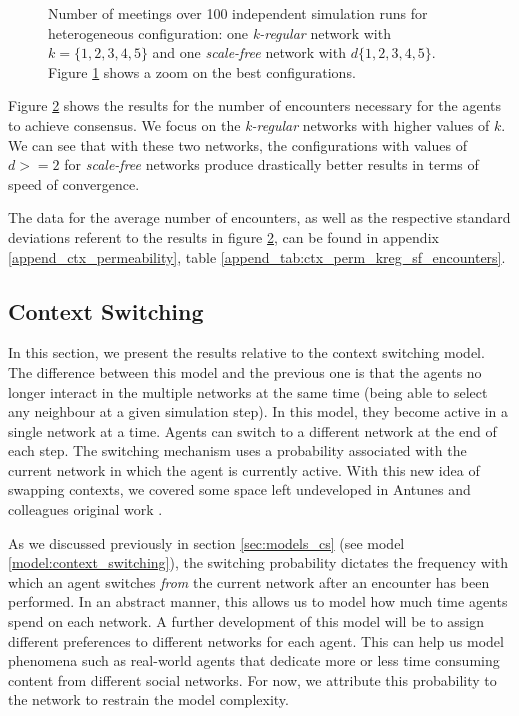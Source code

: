 \documentclass[preprint,number]{elsarticle}
\begin{document}
\begin{figure}[H]
\begin{subfigure}{.49\linewidth}
		\caption{}
		\label{fig:ctx_perm_sfkreg_1020304050best}
	\end{subfigure}
	\begin{minipage}{0.9\linewidth}
		\vspace{0.2cm}
		\caption{Number of meetings over 100 independent simulation runs for heterogeneous configuration: one \textit{k-regular} network with  $k=\{1,2,3,4,5\}$ and one \textit{scale-free} network with $d\{1,2,3,4,5\}$. Figure \ref{fig:ctx_perm_sfkreg_1020304050best} shows a zoom on the best configurations.}
		\label{fig:ctx_perm_sfkreg}
	\end{minipage}
\end{figure}

Figure \ref{fig:ctx_perm_sfkreg} shows the results for the number of encounters necessary for the agents to achieve consensus. We focus on the \textit{k-regular} networks with higher values of $k$. We can see that with these two networks, the configurations with values of $d>=2$ for \textit{scale-free} networks produce drastically better results in terms of speed of convergence.

The data for the average number of encounters, as well as the respective standard deviations referent to the results in figure \ref{fig:ctx_perm_sfkreg}, can be found in appendix \ref{append_ctx_permeability}, table \ref{append_tab:ctx_perm_kreg_sf_encounters}.



\subsection{Context Switching}
\noindent In this section, we present the results relative to the context switching model. The difference between this model and the previous one is that the agents no longer interact in the multiple networks at the same time (being able to select any neighbour at a given simulation step). In this model, they become active in a single network at a time. Agents can switch to a different network at the end of each step. The switching mechanism uses a probability associated with the current network in which the agent is currently active. With this new idea of swapping contexts, we covered some space left undeveloped in Antunes and colleagues original work \cite{Antunes2007,Antunes2010}. 

As we discussed previously in section \ref{sec:models_cs} (see model \ref{model:context_switching}), the switching probability dictates the frequency with which an agent switches \textit{from} the current network after an encounter has been performed. In an abstract manner, this allows us to model how much time agents spend on each network. A further development of this model will be to assign different preferences to different networks for each agent. This can help us model phenomena such as real-world agents that dedicate more or less time consuming content from different social networks. For now, we attribute this probability to the network to restrain the model complexity.
\end{document}
